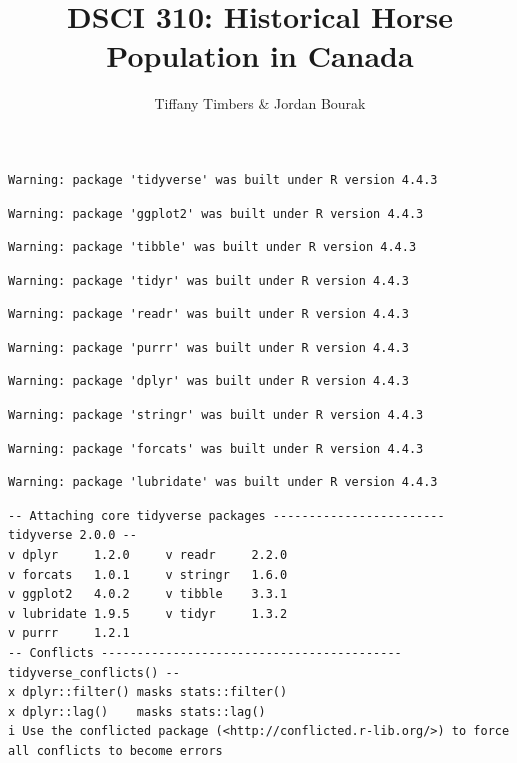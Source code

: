 \documentclass[
  letterpaper,
  DIV=11,
  numbers=noendperiod]{scrartcl}
\title{DSCI 310: Historical Horse Population in Canada}
\author{Tiffany Timbers \& Jordan Bourak}
\date{}
\begin{document}
\maketitle


\begin{verbatim}
Warning: package 'tidyverse' was built under R version 4.4.3
\end{verbatim}

\begin{verbatim}
Warning: package 'ggplot2' was built under R version 4.4.3
\end{verbatim}

\begin{verbatim}
Warning: package 'tibble' was built under R version 4.4.3
\end{verbatim}

\begin{verbatim}
Warning: package 'tidyr' was built under R version 4.4.3
\end{verbatim}

\begin{verbatim}
Warning: package 'readr' was built under R version 4.4.3
\end{verbatim}

\begin{verbatim}
Warning: package 'purrr' was built under R version 4.4.3
\end{verbatim}

\begin{verbatim}
Warning: package 'dplyr' was built under R version 4.4.3
\end{verbatim}

\begin{verbatim}
Warning: package 'stringr' was built under R version 4.4.3
\end{verbatim}

\begin{verbatim}
Warning: package 'forcats' was built under R version 4.4.3
\end{verbatim}

\begin{verbatim}
Warning: package 'lubridate' was built under R version 4.4.3
\end{verbatim}

\begin{verbatim}
-- Attaching core tidyverse packages ------------------------ tidyverse 2.0.0 --
v dplyr     1.2.0     v readr     2.2.0
v forcats   1.0.1     v stringr   1.6.0
v ggplot2   4.0.2     v tibble    3.3.1
v lubridate 1.9.5     v tidyr     1.3.2
v purrr     1.2.1     
-- Conflicts ------------------------------------------ tidyverse_conflicts() --
x dplyr::filter() masks stats::filter()
x dplyr::lag()    masks stats::lag()
i Use the conflicted package (<http://conflicted.r-lib.org/>) to force all conflicts to become errors
\end{verbatim}
\end{document}
